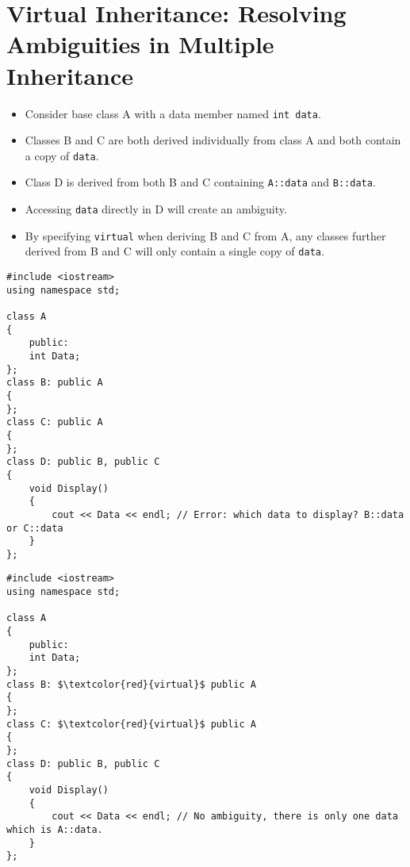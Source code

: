\documentclass[12pt,a4paper]{article}
\begin{document}
\section{Virtual Inheritance: Resolving Ambiguities in Multiple Inheritance}
\begin{itemize}
\item Consider base class A with a data member named \verb|int data|.
\item Classes B and C are both derived individually from class A and both contain a copy of \verb|data|.
\item Class D is derived from both B and C containing \verb|A::data| and \verb|B::data|.
\item Accessing \verb|data| directly in D will create an ambiguity.
\item By specifying \verb|virtual| when deriving B and C from A, any classes further derived from B and C will only contain a single copy of \verb|data|.
\end{itemize}
\begin{lstlisting}[caption={Ambiguity in Multiple Inheritance}]
#include <iostream>
using namespace std;

class A
{
	public:
	int Data;
};
class B: public A
{
};
class C: public A
{
};
class D: public B, public C
{
	void Display()
	{
		cout << Data << endl; // Error: which data to display? B::data or C::data
	}
};
\end{lstlisting}
\begin{lstlisting}[caption={Resolving Ambiguity in Multiple Inheritance},escapechar=$]
#include <iostream>
using namespace std;

class A
{
	public:
	int Data;
};
class B: $\textcolor{red}{virtual}$ public A
{
};
class C: $\textcolor{red}{virtual}$ public A
{
};
class D: public B, public C
{
	void Display()
	{
		cout << Data << endl; // No ambiguity, there is only one data which is A::data.
	}
};
\end{lstlisting}
%
%
\end{document}
